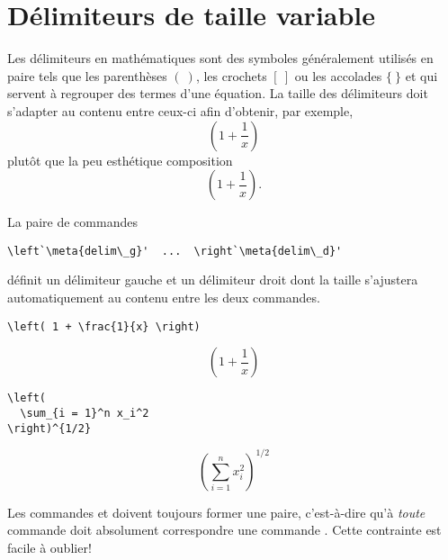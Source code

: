 \section{Délimiteurs de taille variable}
\label{sec:math:delimiteurs}

Les délimiteurs en mathématiques sont des symboles généralement
utilisés en paire tels que les parenthèses $(~)$, les crochets $[~]$
ou les accolades $\{~\}$ et qui servent à regrouper des termes d'une
équation. La taille des délimiteurs doit s'adapter au contenu entre
ceux-ci afin d'obtenir, par exemple,
\begin{equation*}
  \left( 1 + \frac{1}{x} \right)
\end{equation*}
plutôt que la peu esthétique composition
\begin{equation*}
  (1 + \frac{1}{x}).
\end{equation*}

La paire de commandes
\begin{lstlisting}
\left`\meta{delim\_g}'  ...  \right`\meta{delim\_d}'
\end{lstlisting}
définit un délimiteur gauche  et un délimiteur droit
 dont la taille s'ajustera automatiquement au contenu
entre les deux commandes.
\begin{demo}
  \begin{texample}[0.55\linewidth]
\begin{lstlisting}
\left( 1 + \frac{1}{x} \right)
\end{lstlisting}
    \producing
    \begin{equation*}
      \left( 1 + \frac{1}{x} \right)
    \end{equation*}
  \end{texample}

  \begin{texample}[0.55\linewidth]
\begin{lstlisting}
\left(
  \sum_{i = 1}^n x_i^2
\right)^{1/2}
\end{lstlisting}
    \producing
    \begin{equation*}
      \left(
        \sum_{i = 1}^n x_i^2
      \right)^{1/2}
    \end{equation*}
  \end{texample}
\end{demo}
Les commandes \cmd{\left} et \cmd{\right} doivent toujours former une
paire, c'est-à-dire qu'à \emph{toute} commande \cmdprint{\left} doit
absolument correspondre une commande \cmdprint{\right}. Cette
contrainte est facile à oublier!

